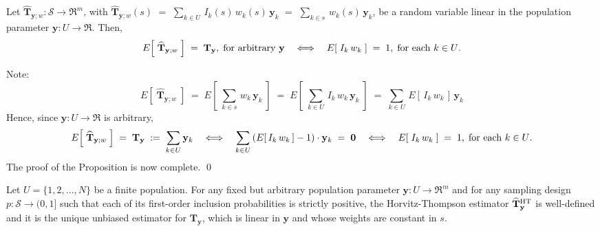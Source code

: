 \begin{proposition}
\label{proposition:Unbiasedness}
\mbox{}
\vskip 0.2cm
\noindent
Let $\widehat{\mathbf{T}}_{\mathbf{y};w} : \mathcal{S} \longrightarrow \Re^{m}$, with
$\widehat{\mathbf{T}}_{\mathbf{y};w}(s)$
$=$ $\underset{k \in U}{\sum}\,I_{k}(s)\,w_{k}(s)\,\mathbf{y}_{k}$
$=$ $\underset{k \in s}{\sum}\,w_{k}(s)\,\mathbf{y}_{k}$,
be a random variable linear in the population parameter
$\mathbf{y} : U \longrightarrow \Re$.
Then,
\begin{equation*}
E\!\left[\;\widehat{\mathbf{T}}_{\mathbf{y};w}\;\right] \; = \; \mathbf{T}_{\mathbf{y}},\;\textnormal{for arbitrary $\mathbf{y}$}
\quad\Longleftrightarrow\quad
E\!\left[\;I_{k}\,w_{k}\;\right] \; = \; 1,\;\textnormal{for each $k \in U$}.
\end{equation*}
\end{proposition}
\proof
Note:
\begin{equation*}
E\!\left[\;\widehat{\mathbf{T}}_{\mathbf{y};w}\;\right]
\;=\; E\!\left[\;\underset{k \in s}{\sum}\,w_{k}\,\mathbf{y}_{k}\;\right]
\;=\; E\!\left[\;\underset{k \in U}{\sum}\,I_{k}\,w_{k}\,\mathbf{y}_{k}\;\right]
\;=\; \underset{k \in U}{\sum}\,E\!\left[\,I_{k}\,w_{k}\,\right]\,\mathbf{y}_{k}
\end{equation*}
Hence, since $\mathbf{y} : U \longrightarrow \Re$ is arbitrary,
\begin{equation*}
E\!\left[\;\widehat{\mathbf{T}}_{\mathbf{y};w}\;\right] \;=\; \mathbf{T}_{\mathbf{y}} \; := \; \underset{k \in U}{\sum}\,\mathbf{y}_{k}
\quad\Longleftrightarrow\quad
\sum_{k \in U}\left(E\!\left[\,I_{k}\,w_{k}\,\right]-1\right)\cdot\mathbf{y}_{k} \; = \; \mathbf{0}
\quad\Longleftrightarrow\quad
E\!\left[\;I_{k}\,w_{k}\;\right] \; = \; 1,\;\textnormal{for each $k \in U$}.
\end{equation*}
The proof of the Proposition is now complete. \qed

\begin{corollary}
\mbox{}
\vskip 0.2cm
\noindent
Let $U = \{1,2,\ldots,N\}$ be a finite population.
For any fixed but arbitrary population parameter $\mathbf{y} : U \longrightarrow \Re^{m}$ and
for any sampling design $p : \mathcal{S} \longrightarrow (0,1]$ such that each of
its first-order inclusion probabilities is strictly positive,
the Horvitz-Thompson estimator $\widehat{\mathbf{T}}^{\textnormal{HT}}_{\mathbf{y}}$ is well-defined
and it is the unique unbiased estimator for $\mathbf{T}_{\mathbf{y}}$, which is linear in $\mathbf{y}$ and
whose weights are constant in $s$.
\end{corollary}

